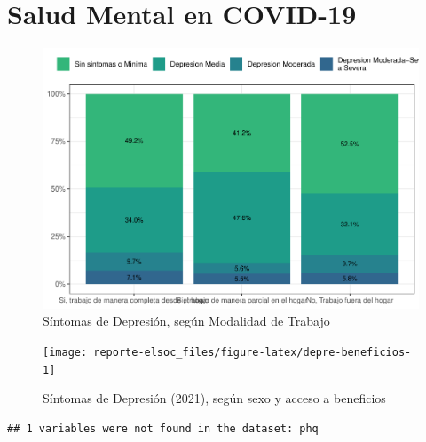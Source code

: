 \documentclass[
  12pt,
  openany]{book}
\begin{document}
\hypertarget{salud-mental-en-covid-19}{%
\section{Salud Mental en COVID-19}\label{salud-mental-en-covid-19}}

\begin{figure}

{\centering \includegraphics{reporte-elsoc_files/figure-latex/depre-teletrabajo-1} 

}

\caption{Síntomas de Depresión, según Modalidad de Trabajo}\label{fig:depre-teletrabajo}
\end{figure}

\begin{figure}

{\centering \texttt{[image: reporte-elsoc\_files/figure-latex/depre-beneficios-1]} 

}

\caption{Síntomas de Depresión (2021), según sexo y acceso a beneficios}\label{fig:depre-beneficios}
\end{figure}

\begin{verbatim}
## 1 variables were not found in the dataset: phq
\end{verbatim}
\end{document}
